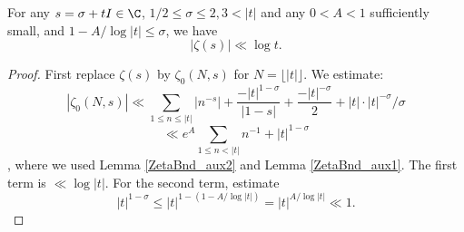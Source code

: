 \begin{lemma}[ZetaUpperBnd]
\label{ZetaUpperBnd}
\leanok
For any $s = \sigma + tI \in \C$, $1/2 \le \sigma\le 2, 3 < |t|$
  and any $0 < A < 1$ sufficiently small, and $1-A/\log |t| \le \sigma$, we have
  $$
  |\zeta(s)| \ll \log t.
  $$
\end{lemma}
\begin{proof}
\leanok
First replace $\zeta(s)$ by $\zeta_0(N,s)$ for $N = \lfloor |t| \rfloor$.
  We estimate:
  $$
  |\zeta_0(N,s)| \ll
  \sum_{1\le n \le |t|} |n^{-s}|
  +
  \frac{- |t|^{1-\sigma}}{|1-s|} + \frac{-|t|^{-\sigma}}{2} +
  |t| \cdot |t| ^ {-σ} / σ
  $$
  $$
  \ll
  e^A \sum_{1\le n < |t|} n^{-1}
  +|t|^{1-\sigma}
  $$
  ,
  where we used Lemma \ref{ZetaBnd_aux2} and Lemma \ref{ZetaBnd_aux1}.
  The first term is $\ll \log |t|$.
  For the second term, estimate
  $$
  |t|^{1-\sigma}
  \le |t|^{1-(1-A/\log |t|)}
  = |t|^{A/\log |t|} \ll 1.
  $$
\end{proof}
